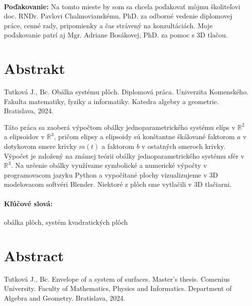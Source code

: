\documentclass[12pt, twoside]{book}
\theoremstyle{definition}
\begin{document}

\frontmatter

\setcounter{page}{3}
\newpage 
~

\vfill
{\bf Poďakovanie:} Na tomto mieste by som sa chcela poďakovať môjmu školiteľovi
doc. RNDr. Pavlovi Chalmovianskému, PhD. za odborné vedenie diplomovej práce, cenné rady, pripomienky a čas strávený na konzultáciách. Moje poďakovanie patrí aj Mgr. Adriane Bosákovej, PhD. za pomoc s 3D tlačou.


\newpage 
\section*{Abstrakt}
Tutková J., Bc. Obálka systému plôch. Diplomová práca. Univerzita Komenského. Fakulta matematiky, fyziky a informatiky. Katedra algebry a geometrie. Bratislava, 2024.
\vspace{\baselineskip}

\noindent Táto práca sa zaoberá výpočtom obálky jednoparametrického systému elíps v $\mathbb{R}^2$ a elipsoidov v $\mathbb{R}^3$, pričom elipsy a elipsoidy sú konštantne škálované faktorom $a$ v dotykovom smere krivky $m(t)$ a faktorom $b$ v ostatných smeroch krivky. Výpočet je založený na známej teórii obálky jednoparametrického systému sfér v $\mathbb{R}^3.$ Na určenie obálky využívame symbolické a numerické výpočty v programovacom jazyku Python a vypočítané plochy vizualizujeme v 3D modelovacom softvéri Blender. Niektoré z plôch sme vytlačili v 3D tlačiarni.

\paragraph*{Kľúčové slová:} obálka plôch, systém kvadratických plôch


\newpage
\section*{Abstract} 
Tutková J., Bc. Envelope of a system of surfaces. Master's thesis. Comenius University. Faculty of Mathematics, Physics and Informatics. Department of Algebra and Geometry. Bratislava, 2024.
\vspace{\baselineskip}
\end{document}
